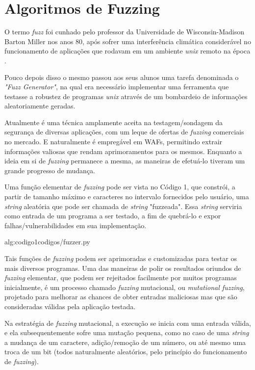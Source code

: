 \section{Algoritmos de Fuzzing}

 O termo \textit{fuzz} foi cunhado pelo professor da Universidade de Wisconsin-Madison Barton Miller nos anos 80, após sofrer uma interferência climática considerável no funcionamento de aplicações que rodavam em um ambiente \textit{unix} remoto na época \cite{fuzzing_info}. 

Pouco depois disso o mesmo passou aos seus alunos uma tarefa denominada o \textit{"Fuzz Generator"}, na qual era necessário implementar uma ferramenta que testasse a robustez de programas \textit{unix} através de um bombardeio de informações aleatoriamente geradas.

Atualmente é uma técnica amplamente aceita na testagem/sondagem da segurança de diversas aplicações, com um leque de ofertas de \textit{fuzzing} comerciais no mercado. E naturalmente é empregável em WAFs, permitindo extrair informações valiosas que rendam aprimoramentos para os mesmos. Enquanto a ideia em si de \textit{fuzzing} permanece a mesma, as maneiras de efetuá-lo tiveram um grande progresso de mudança.


Uma função elementar de \textit{fuzzing} pode ser vista no Código 1, que constrói, a partir de tamanho máximo e caracteres no intervalo fornecidos pelo usuário, uma \textit{string} aleatória que pode ser chamada de \textit{string} "fuzzeada". Essa \textit{string} serviria como entrada de um programa a ser testado, a fim de quebrá-lo e expor falhas/vulnerabilidades em sua implementação.

 {alg:codigo1}{codigos/fuzzer.py}

\bigskip
Tais funções de \textit{fuzzing} podem ser aprimoradas e customizadas para testar os mais diversos programas. Uma das maneiras de polir os resultados oriundos de \textit{fuzzing} elementar, que podem ser rejeitados facilmente por muitos programas inicialmente, é um processo chamado \textit{fuzzing} mutacional, ou \textit{mutational fuzzing}, projetado para melhorar as chances de obter entradas maliciosas mas que são consideradas válidas pela aplicação testada.

Na estratégia de \textit{fuzzing} mutacional, a execução se inicia com uma entrada válida, e ela subsequentemente sofre uma mutação pequena, como no caso de uma \textit{string} a mudança de um caractere, adição/remoção de um número, ou até mesmo uma troca de um bit (todos naturalmente aleatórios, pelo princípio do funcionamento de \textit{fuzzing}).

